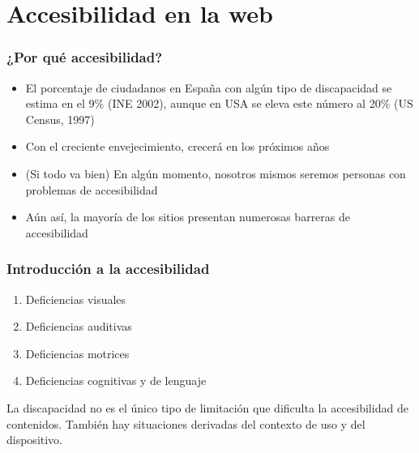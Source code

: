 \section{Accesibilidad en la web}


\begin{frame}
\frametitle{¿Por qué accesibilidad?}

\begin{itemize}
   \item El porcentaje de ciudadanos en España con algún tipo de discapacidad se estima en el 9\% (INE 2002), aunque en USA se eleva este número al 20\% (US Census, 1997)
   \item Con el creciente envejecimiento, crecerá en los próximos años
   \item (Si todo va bien) En algún momento, nosotros mismos seremos personas con problemas de accesibilidad
   \item Aún así, la mayoría de los sitios presentan numerosas barreras de accesibilidad
\end{itemize}

\end{frame}



\begin{frame}
\frametitle{Introducción a la accesibilidad}

\begin{enumerate}
   \item Deficiencias visuales
   \item Deficiencias auditivas
   \item Deficiencias motrices
   \item Deficiencias cognitivas y de lenguaje
\end{enumerate}

La discapacidad no es el único tipo de limitación que dificulta la accesibilidad de contenidos. También hay situaciones derivadas del contexto de uso y del dispositivo.

\end{frame}


